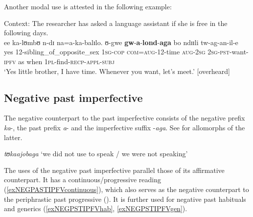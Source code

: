 Another modal use is attested in the following example:

\begin{exe}
\ex Context: The researcher has asked a language assistant if she is free in the following days.\\
\gll ee ka-lʊmbʊ n-dɪ na=a-ka-balɪlo. ʊ-gwe \textbf{gw}-\textbf{a}-\textbf{lond}-\textbf{aga} bo ndɪɪli tw-ag-an-il-e\\
yes 12-sibling\_of\_opposite\_sex \textsc{1sg}-\textsc{cop} \textsc{com}=\textsc{aug}-12-time \textsc{aug}-\textsc{2sg} \textsc{2sg}-\textsc{pst}-want-\textsc{ipfv} as when \textsc{1pl}-find-\textsc{recp}-\textsc{appl}-\textsc{subj}\\
\glt \lq Yes little brother, I have time. Whenever you want, let's meet.' [overheard]
\end{exe}
\subsection{Negative past imperfective}\label{NegPSTIPFV}
The negative counterpart to the past imperfective consists of the negative prefix \textit{ka}-, the past prefix \textit{a}- and the imperfective  suffix -\textit{aga}. See  for allomorphs of the latter.

\begin{exe}
\ex \textit{tʊkaajobaga} \lq we did not use to speak / we were not speaking'
\end{exe}

The uses of the negative past imperfective parallel those of its affirmative counterpart. It has a continuous/progressive reading (\ref{exNEGPASTIPFVcontinuous}), which also serves as the negative counterpart to the periphrastic past progressive (). It is further used for negative past habituals and generics (\ref{exNEGPSTIPFVhab}, \ref{exNEGPSTIPFVgen}).

